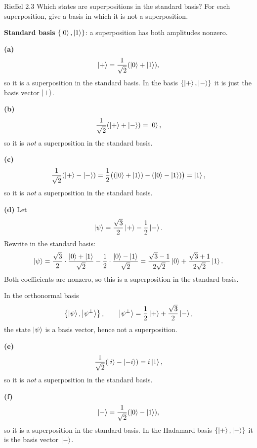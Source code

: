 \begin{exercise}{Rieffel 2.3}
Which states are superpositions in the standard basis? For each superposition, give a basis in which it is not a superposition.
\end{exercise}
\begin{solution}
\textbf{Standard basis} $\{\left|0\right\rangle,\left|1\right\rangle\}$: a superposition has both amplitudes nonzero.

\textbf{(a)}
\[
\left|+\right\rangle=\frac{1}{\sqrt{2}}(\left|0\right\rangle+\left|1\right\rangle),
\]
so it is a superposition in the standard basis. In the basis $\{\left|+\right\rangle,\left|-\right\rangle\}$ it is just the basis vector $\left|+\right\rangle$.

\textbf{(b)}
\[
\frac{1}{\sqrt{2}}(\left|+\right\rangle+\left|-\right\rangle)
=\left|0\right\rangle,
\]
so it is \emph{not} a superposition in the standard basis.

\textbf{(c)}
\[
\frac{1}{\sqrt{2}}(\left|+\right\rangle-\left|-\right\rangle)
=\frac{1}{2}\bigl((\left|0\right\rangle+\left|1\right\rangle)-(\left|0\right\rangle-\left|1\right\rangle)\bigr)
=\left|1\right\rangle,
\]
so it is \emph{not} a superposition in the standard basis.

\textbf{(d)} Let
\[
\left|\psi\right\rangle=\frac{\sqrt{3}}{2}\left|+\right\rangle-\frac{1}{2}\left|-\right\rangle.
\]
Rewrite in the standard basis:
\[
\left|\psi\right\rangle
=\frac{\sqrt{3}}{2}\cdot\frac{\left|0\right\rangle+\left|1\right\rangle}{\sqrt{2}}
-\frac{1}{2}\cdot\frac{\left|0\right\rangle-\left|1\right\rangle}{\sqrt{2}}
=\frac{\sqrt{3}-1}{2\sqrt{2}}\left|0\right\rangle
+\frac{\sqrt{3}+1}{2\sqrt{2}}\left|1\right\rangle.
\]
Both coefficients are nonzero, so this is a superposition in the standard basis.

In the orthonormal basis
\[
\left\{
\left|\psi\right\rangle,
\left|\psi^\perp\right\rangle
\right\},
\qquad
\left|\psi^\perp\right\rangle=\frac{1}{2}\left|+\right\rangle+\frac{\sqrt{3}}{2}\left|-\right\rangle,
\]
the state $\left|\psi\right\rangle$ is a basis vector, hence not a superposition.

\textbf{(e)}
\[
\frac{1}{\sqrt{2}}(\left|i\right\rangle-\left|-i\right\rangle)=i\left|1\right\rangle,
\]
so it is \emph{not} a superposition in the standard basis.

\textbf{(f)}
\[
\left|-\right\rangle=\frac{1}{\sqrt{2}}(\left|0\right\rangle-\left|1\right\rangle),
\]
so it is a superposition in the standard basis. In the Hadamard basis $\{\left|+\right\rangle,\left|-\right\rangle\}$ it is the basis vector $\left|-\right\rangle$.
\end{solution}

